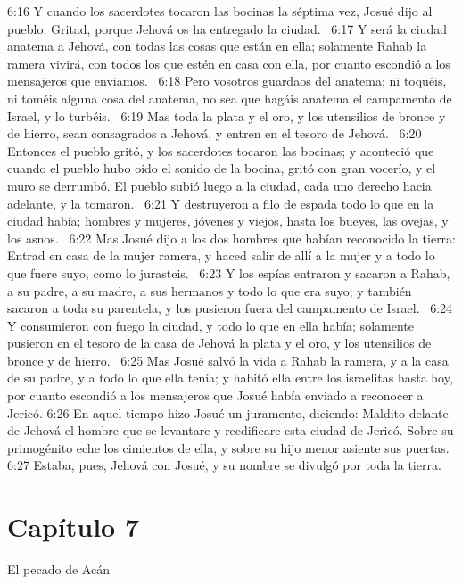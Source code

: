 6:16 Y cuando los sacerdotes tocaron las bocinas la séptima vez, Josué dijo al pueblo: Gritad, porque Jehová os ha entregado la ciudad.  
6:17 Y será la ciudad anatema a Jehová, con todas las cosas que están en ella; solamente Rahab la ramera vivirá, con todos los que estén en casa con ella, por cuanto escondió a los mensajeros que enviamos.  
6:18 Pero vosotros guardaos del anatema; ni toquéis, ni toméis alguna cosa del anatema, no sea que hagáis anatema el campamento de Israel, y lo turbéis.  
6:19 Mas toda la plata y el oro, y los utensilios de bronce y de hierro, sean consagrados a Jehová, y entren en el tesoro de Jehová.  
6:20 Entonces el pueblo gritó, y los sacerdotes tocaron las bocinas; y aconteció que cuando el pueblo hubo oído el sonido de la bocina, gritó con gran vocerío, y el muro se derrumbó. El pueblo subió luego a la ciudad, cada uno derecho hacia adelante, y la tomaron.  
6:21 Y destruyeron a filo de espada todo lo que en la ciudad había; hombres y mujeres, jóvenes y viejos, hasta los bueyes, las ovejas, y los asnos.  
6:22 Mas Josué dijo a los dos hombres que habían reconocido la tierra: Entrad en casa de la mujer ramera, y haced salir de allí a la mujer y a todo lo que fuere suyo, como lo jurasteis.  
6:23 Y los espías entraron y sacaron a Rahab, a su padre, a su madre, a sus hermanos y todo lo que era suyo; y también sacaron a toda su parentela, y los pusieron fuera del campamento de Israel.  
6:24 Y consumieron con fuego la ciudad, y todo lo que en ella había; solamente pusieron en el tesoro de la casa de Jehová la plata y el oro, y los utensilios de bronce y de hierro.  
6:25 Mas Josué salvó la vida a Rahab la ramera, y a la casa de su padre, y a todo lo que ella tenía; y habitó ella entre los israelitas hasta hoy, por cuanto escondió a los mensajeros que Josué había enviado a reconocer a Jericó. 
6:26 En aquel tiempo hizo Josué un juramento, diciendo: Maldito delante de Jehová el hombre que se levantare y reedificare esta ciudad de Jericó. Sobre su primogénito eche los cimientos de ella, y sobre su hijo menor asiente sus puertas. 
6:27 Estaba, pues, Jehová con Josué, y su nombre se divulgó por toda la tierra.  
\section*{Capítulo 7 }
El pecado de Acán  

